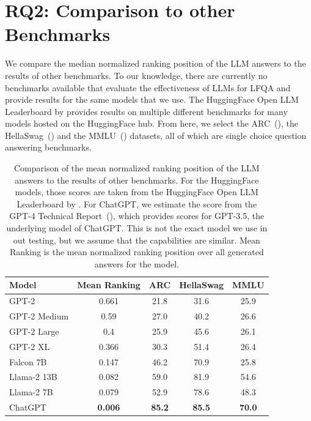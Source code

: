 \section{RQ2: Comparison to other Benchmarks}\label{sec:benchmark_comparison}
We compare the median normalized ranking position of the LLM answers to the results of other benchmarks.
To our knowledge, there are currently no benchmarks available that evaluate the effectiveness of LLMs for LFQA and provide results for the same models that we use.
The HuggingFace Open LLM Leaderboard by \cite{beeching:2023:Open} provides results on multiple different benchmarks for many models hosted on the HuggingFace hub.
From here, we select the ARC~(\cite{clark:2018:Think}), the HellaSwag~(\cite{zellers:2019:HellaSwag}) and the MMLU~(\cite{hendrycks:2020:Measuring}) datasets, all of which are single choice question answering benchmarks.
\begin{table}[tb]
    \centering
    \begin{tabularx}{\textwidth}{lcccc}
    \hline
    \textbf{Model} & \textbf{Mean Ranking} & \textbf{ARC}  & \textbf{HellaSwag} & \textbf{MMLU} \\\hline
    GPT-2          & 0.661                             & 21.8          & 31.6               & 25.9          \\
    GPT-2 Medium   & 0.59                              & 27.0          & 40.2               & 26.6          \\
    GPT-2 Large    & 0.4                               & 25.9          & 45.6               & 26.1          \\
    GPT-2 XL       & 0.366                             & 30.3          & 51.4               & 26.4          \\
    Falcon 7B      & 0.147                             & 46.2          & 70.9               & 25.8          \\
    Llama-2 13B    & 0.082                             & 59.0          & 81.9               & 54.6          \\
    Llama-2 7B     & 0.079                             & 52.9          & 78.6               & 48.3          \\
    ChatGPT        & \textbf{0.006}                    & \textbf{85.2} & \textbf{85.5}      & \textbf{70.0} \\
    \hline
    \end{tabularx}
    \caption{Comparison of the mean normalized ranking position of the LLM answers to the results of other benchmarks.
    For the HuggingFace models, those scores are taken from the HuggingFace Open LLM Leaderboard by \cite{beeching:2023:Open}.
    For ChatGPT, we estimate the score from the GPT-4 Technical Report~(\cite{openai:2023:GPT}), which provides scores for GPT-3.5, the underlying model of ChatGPT.
    This is not the exact model we use in out testing, but we assume that the capabilities are similar.
    Mean Ranking is the mean normalized ranking position over all generated answers for the model.
    }
    \label{tab:benchmark_comparison}
\end{table}
